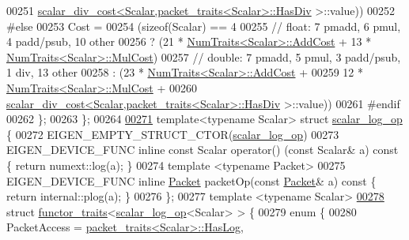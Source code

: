 \begin{DoxyCode}
00251         \hyperlink{struct_eigen_1_1internal_1_1scalar__div__cost}{scalar\_div\_cost<Scalar,packet\_traits<Scalar>::HasDiv}
      >::value))
00252 \textcolor{preprocessor}{#else}
00253     Cost =
00254     (\textcolor{keyword}{sizeof}(Scalar) == 4
00255      \textcolor{comment}{// float: 7 pmadd, 6 pmul, 4 padd/psub, 10 other}
00256      ? (21 * \hyperlink{group___core___module_struct_eigen_1_1_num_traits}{NumTraits<Scalar>::AddCost} + 13 * 
      \hyperlink{group___core___module_struct_eigen_1_1_num_traits}{NumTraits<Scalar>::MulCost})
00257      \textcolor{comment}{// double: 7 pmadd, 5 pmul, 3 padd/psub, 1 div,  13 other}
00258      : (23 * \hyperlink{group___core___module_struct_eigen_1_1_num_traits}{NumTraits<Scalar>::AddCost} +
00259         12 * \hyperlink{group___core___module_struct_eigen_1_1_num_traits}{NumTraits<Scalar>::MulCost} +
00260         \hyperlink{struct_eigen_1_1internal_1_1scalar__div__cost}{scalar\_div\_cost<Scalar,packet\_traits<Scalar>::HasDiv}
      >::value))
00261 \textcolor{preprocessor}{#endif}
00262   \};
00263 \};
00264 
\hyperlink{struct_eigen_1_1internal_1_1scalar__log__op}{00271} \textcolor{keyword}{template}<\textcolor{keyword}{typename} Scalar> \textcolor{keyword}{struct }\hyperlink{struct_eigen_1_1internal_1_1scalar__log__op}{scalar\_log\_op} \{
00272   EIGEN\_EMPTY\_STRUCT\_CTOR(\hyperlink{struct_eigen_1_1internal_1_1scalar__log__op}{scalar\_log\_op})
00273   EIGEN\_DEVICE\_FUNC \textcolor{keyword}{inline} \textcolor{keyword}{const} Scalar operator() (\textcolor{keyword}{const} Scalar& a)\textcolor{keyword}{ const }\{ \textcolor{keywordflow}{return} numext::log(a); \}
00274   \textcolor{keyword}{template} <\textcolor{keyword}{typename} Packet>
00275   EIGEN\_DEVICE\_FUNC \textcolor{keyword}{inline} \hyperlink{union_eigen_1_1internal_1_1_packet}{Packet} packetOp(\textcolor{keyword}{const} \hyperlink{union_eigen_1_1internal_1_1_packet}{Packet}& a)\textcolor{keyword}{ const }\{ \textcolor{keywordflow}{return} internal::plog(a); \}
00276 \};
00277 \textcolor{keyword}{template} <\textcolor{keyword}{typename} Scalar>
\hyperlink{struct_eigen_1_1internal_1_1functor__traits_3_01scalar__log__op_3_01_scalar_01_4_01_4}{00278} \textcolor{keyword}{struct }\hyperlink{struct_eigen_1_1internal_1_1functor__traits}{functor\_traits}<\hyperlink{struct_eigen_1_1internal_1_1scalar__log__op}{scalar\_log\_op}<Scalar> > \{
00279   \textcolor{keyword}{enum} \{
00280     PacketAccess = \hyperlink{struct_eigen_1_1internal_1_1packet__traits}{packet\_traits<Scalar>::HasLog},

\end{DoxyCode}
